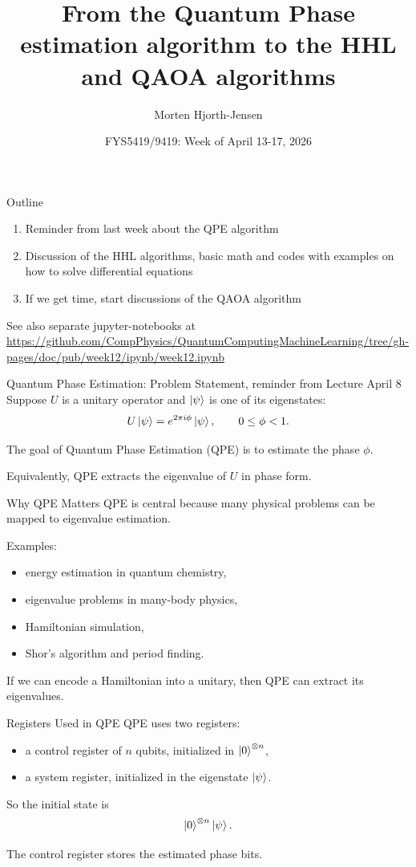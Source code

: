 \documentclass{beamer}
\title{From the Quantum Phase estimation algorithm to the HHL and QAOA algorithms}
\author{Morten Hjorth-Jensen}
\date{FYS5419/9419: Week of April 13-17, 2026}
\begin{document}
\frame{\titlepage}

\begin{frame}{Outline}
\begin{enumerate}
\item Reminder from last week about the QPE algorithm
\item Discussion of the HHL algorithms, basic math and codes with examples on how to solve differential equations
\item If we get time, start discussions of the QAOA algorithm
\end{enumerate}
See also separate jupyter-notebooks at \url{https://github.com/CompPhysics/QuantumComputingMachineLearning/tree/gh-pages/doc/pub/week12/ipynb/week12.ipynb}
\end{frame}



\begin{frame}{Quantum Phase Estimation: Problem Statement, reminder from Lecture April 8}
Suppose \(U\) is a unitary operator and \(\ket{\psi}\) is one of its eigenstates:
\[
U\ket{\psi}=e^{2\pi i \phi}\ket{\psi},
\qquad 0\le \phi <1.
\]

The goal of Quantum Phase Estimation (QPE) is to estimate the phase \(\phi\).

Equivalently, QPE extracts the eigenvalue of \(U\) in phase form.
\end{frame}

\begin{frame}{Why QPE Matters}
QPE is central because many physical problems can be mapped to eigenvalue estimation.

Examples:
\begin{itemize}
\item energy estimation in quantum chemistry,
\item eigenvalue problems in many-body physics,
\item Hamiltonian simulation,
\item Shor's algorithm and period finding.
\end{itemize}

If we can encode a Hamiltonian into a unitary, then QPE can extract its eigenvalues.
\end{frame}

\begin{frame}{Registers Used in QPE}
QPE uses two registers:

\begin{itemize}
\item a control register of \(n\) qubits, initialized in \(\ket{0}^{\otimes n}\),
\item a system register, initialized in the eigenstate \(\ket{\psi}\).
\end{itemize}

So the initial state is
\[
\ket{0}^{\otimes n}\ket{\psi}.
\]

The control register stores the estimated phase bits.
\end{frame}
\end{document}
